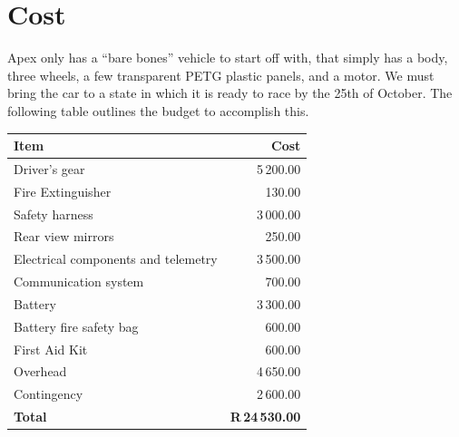 \documentclass[a4paper, 12pt]{article}
\begin{document}



	\section{Cost} %
	\label{sec:cost}
		Apex only has a ``bare bones'' vehicle to start off with, that simply has a body, three wheels, a few transparent PETG plastic panels, and a motor. We must bring the car to a state in which it is ready to race by the 25th of October. The following table outlines the budget to accomplish this.

		\begin{table}[H]
			\begin{tabularx}{\textwidth}{Xr}
				\toprule
				\textbf{Item} & \textbf{Cost} \\
				\midrule
				Driver's gear & 5\,200.00 \\
				Fire Extinguisher & 130.00 \\
				Safety harness & 3\,000.00 \\
				Rear view mirrors & 250.00 \\
				\addlinespace[0.7em]
				Electrical components and telemetry & 3\,500.00 \\
				Communication system & 700.00 \\
				Battery & 3\,300.00 \\
				Battery fire safety bag & 600.00 \\
				\addlinespace[0.7em]
				First Aid Kit & 600.00 \\
				Overhead & 4\,650.00 \\
				Contingency & 2\,600.00 \\
				\addlinespace[0.3em]
				\midrule
				\textbf{Total} & \textbf{R\,24\,530.00}\\
				\bottomrule
			\end{tabularx}
		\end{table}
\end{document}
